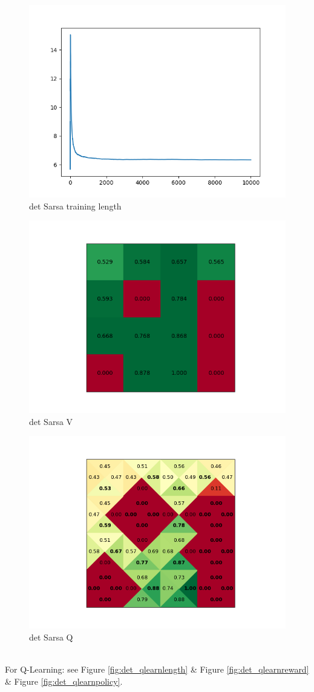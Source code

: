 \documentclass[a4paper]{article}
\begin{document}
\begin{figure}[!ht]
	\centering
	\includegraphics[width=0.8\linewidth]{det_sarsa_length}
	\caption{det Sarsa training length}
	\label{fig:det_sarsalength}
\end{figure}
\begin{figure}[!ht]
	\centering
	\includegraphics[width=0.6\linewidth]{det_sarsa_v}
	\caption{det Sarsa V}
	\label{fig:det_sarsareward}
\end{figure}
\begin{figure}[!ht]
	\centering
	\includegraphics[width=0.6\linewidth]{det_sarsa_q}
	\caption{det Sarsa Q}
	\label{fig:det_sarsapolicy}
\end{figure}
~\\
For Q-Learning: see Figure \ref{fig:det_qlearnlength} \& Figure \ref{fig:det_qlearnreward} \& Figure \ref{fig:det_qlearnpolicy}.
\end{document}
